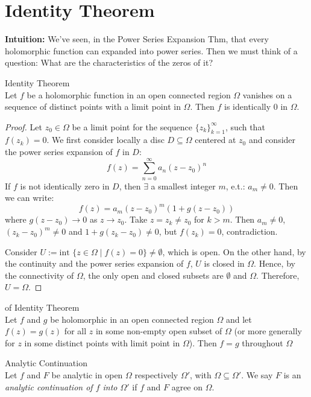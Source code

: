 \section{Identity Theorem}

\noindent\textbf{Intuition:} We've seen, in the Power Series Expansion Thm, that every holomorphic function can expanded into power series. Then we must think of a question: What are the characteristics of the zeros of it?

\begin{theorem}{Identity Theorem}\\
Let $f$ be a holomorphic function in an open connected region $\Omega$ vanishes on a sequence of distinct points with a limit point in $\Omega$. Then $f$ is identically $0$ in $\Omega$.
\end{theorem}

\begin{proof}
    Let $z_0 \in \Omega$ be a limit point for the sequence $\{z_k\}_{k=1}^\infty$, such that $f(z_k)=0$. We first consider locally a disc $D\subseteq \Omega$ centered at $z_0$ and consider the power series expansion of $f$ in $D$:
    \[
    f(z)= \sum_{n=0}^\infty a_n(z-z_0)^n
    \]
    If $f$ is not identically zero in $D$, then $\exists$ a smallest integer $m$, e.t.: $a_m\neq 0$. Then we can write:
    \[
    f(z)= a_m(z-z_0)^m (1+g(z-z_0))
    \]
    where $g(z-z_0) \to 0$ as $z\to z_0$. Take $z=z_k \neq z_0$ for $k>m$. Then $a_m\neq 0$, $(z_k-z_0) ^m\neq 0$ and $1+g(z_k-z_0) \neq 0$, but $f(z_k)=0$, contradiction.

    Consider $U:= \text{int }\{z\in \Omega \mid f(z)=0\} \neq \emptyset$, which is open. On the other hand, by the continuity and the power series expansion of $f$, $U$ is closed in $\Omega$. Hence, by the connectivity of $\Omega$, the only open and closed subsets are $\emptyset$ and $\Omega$. Therefore, $U=\Omega$.
\end{proof}

\begin{corollary}{of Identity Theorem}\\
Let $f$ and $g$ be holomorphic in an open connected region $\Omega$ and let $f(z)=g(z)$ for all $z$ in some non-empty open subset of $\Omega$ (or more generally for $z$ in some distinct points with limit point in $\Omega$). Then $f= g$ throughout $\Omega$
\end{corollary}

\begin{definition}{Analytic Continuation}\\
Let $f$ and $F$ be analytic in open $\Omega$ respectively $\Omega'$, with $\Omega \subseteq \Omega'$. We say $F$ is an \textit{analytic continuation of $f$ into $\Omega'$} if $f$ and $F$ agree on $\Omega$.
\end{definition}

